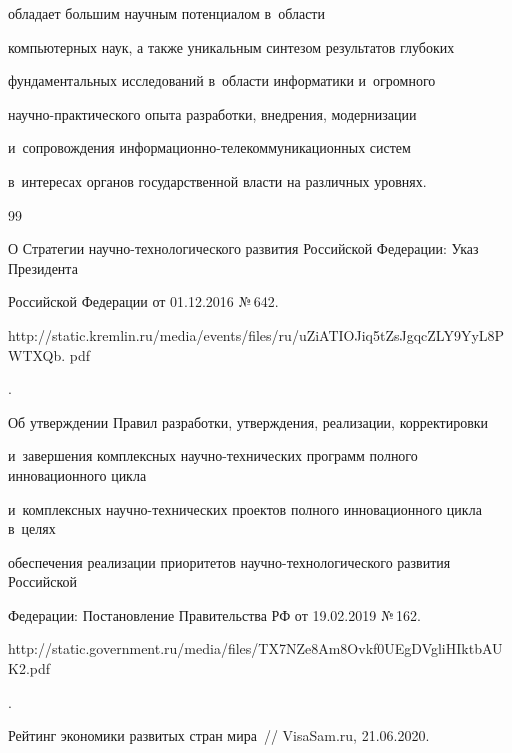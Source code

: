      обладает большим научным потенциалом в~области 

компьютерных наук, а также уникальным синтезом результатов глубоких 

фундаментальных исследований в~области информатики и~огромного  

на\-уч\-но-прак\-ти\-че\-ско\-го опыта разработки, внедрения, модернизации 

и~сопровождения ин\-фор\-ма\-ци\-он\-но-те\-ле\-ком\-му\-ни\-ка\-ци\-он\-ных сис\-тем 

в~интересах органов государственной власти на различных уровнях. 



{\small\frenchspacing

{%


\begin{thebibliography}{99}




О Стратегии научно-технологического развития Российской Федерации: Указ Президента 

Российской Федерации от 01.12.2016 №\,642.

{\sf 

http://static.\linebreak kremlin.ru/media/events/files/ru/uZiATIOJiq5tZsJgqcZLY9YyL8PWTXQb. pdf}.


Об утверждении Правил разработки, утверждения, реализации, корректировки 

и~завершения комплексных на\-уч\-но-тех\-ни\-че\-ских программ полного инновационного цикла 

и~комплексных на\-уч\-но-тех\-ни\-че\-ских проектов полного инновационного цикла в~целях 

обеспечения реализации приоритетов научно-технологического развития Российской 

Федерации: Постановление Правительства РФ от 19.02.2019 №\,162.

{\sf 

http://static.government.ru/media/files/TX7NZe8Am8Ovkf0UEgDVgliHIktbAUK2.\linebreak pdf}.


Рейтинг экономики развитых стран мира~/\!\!/ VisaSam.ru, 21.06.2020. {\sf 

}
\end{thebibliography}}}
